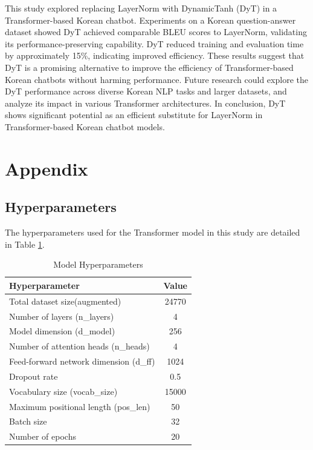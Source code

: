 \documentclass{article}
\begin{document}
This study explored replacing LayerNorm with DynamicTanh (DyT) in a Transformer-based Korean chatbot. Experiments on a Korean question-answer dataset showed DyT achieved comparable BLEU scores to LayerNorm, validating its performance-preserving capability. DyT reduced training and evaluation time by approximately 15\%, indicating improved efficiency. These results suggest that DyT is a promising alternative to improve the efficiency of Transformer-based Korean chatbots without harming performance. Future research could explore the DyT performance across diverse Korean NLP tasks and larger datasets, and analyze its impact in various Transformer architectures. In conclusion, DyT shows significant potential as an efficient substitute for LayerNorm in Transformer-based Korean chatbot models.



\section*{Appendix}

\subsection{Hyperparameters}
The hyperparameters used for the Transformer model in this study are detailed in Table \ref{tab:model_hyperparameters}.

\begin{center}
\begin{table}
\caption{Model Hyperparameters}
\label{tab:model_hyperparameters}
\begin{tabular}{lc}
\toprule
Hyperparameter & Value \\
\midrule
Total dataset size(augmented) & 24770 \\
Number of layers (n\_layers) & 4 \\
Model dimension (d\_model) & 256 \\
Number of attention heads (n\_heads) & 4 \\
Feed-forward network dimension (d\_ff) & 1024 \\
Dropout rate & 0.5 \\
Vocabulary size (vocab\_size) & 15000 \\
Maximum positional length (pos\_len) & 50 \\
Batch size & 32 \\
Number of epochs & 20 \\
\bottomrule
\end{tabular}
\end{table}
\end{center}
\end{document}
